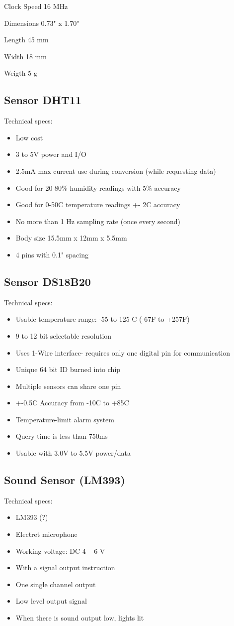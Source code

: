 \documentclass[12pt]{report}
\begin{document}
\begin{appendices}
Clock Speed	16 MHz

Dimensions	0.73" x 1.70"

Length	45 mm

Width	18 mm

Weigth	5 g

\subsection*{Sensor DHT11}
Technical specs:
\begin{itemize}
\item Low cost
\item  3 to 5V power and I/O
\item   2.5mA max current use during conversion (while requesting data)
\item  Good for 20-80\% humidity readings with 5\% accuracy
 \item   Good for 0-50C temperature readings +- 2C accuracy
 \item   No more than 1 Hz sampling rate (once every second)
 \item   Body size 15.5mm x 12mm x 5.5mm
 \item   4 pins with 0.1" spacing

    \end{itemize}

\subsection*{Sensor DS18B20}
Technical specs:
\begin{itemize}
\item Usable temperature range: -55 to 125 C (-67F to +257F)
\item 9 to 12 bit selectable resolution
\item Uses 1-Wire interface- requires only one digital pin for communication
\item Unique 64 bit ID burned into chip
\item Multiple sensors can share one pin
\item +-0.5C Accuracy from -10C to +85C
\item Temperature-limit alarm system
\item Query time is less than 750ms
\item Usable with 3.0V to 5.5V power/data
\end{itemize}
\subsection*{Sound Sensor (LM393)}
Technical specs:
\begin{itemize}
\item LM393 (?)
\item Electret microphone
\item Working voltage: DC 4 ~ 6 V
\item With a signal output instruction
\item One single channel output
\item Low level output signal
\item When there is sound output low, lights lit
\end{itemize}

\end{appendices}
\end{document}
